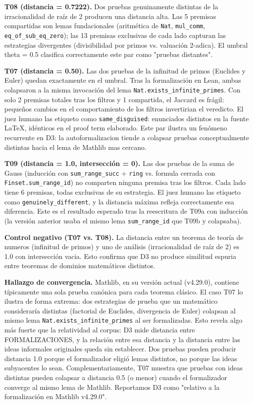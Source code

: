 \documentclass[12pt,a4paper]{article}
\theoremstyle{remark}
\begin{document}
\textbf{T08 (distancia = 0.7222).} Dos pruebas genuinamente distintas de la irracionalidad de raíz de 2 producen una distancia alta. Las 5 premisas compartidas son lemas fundacionales (aritmética de \texttt{Nat}, \texttt{mul\_comm}, \texttt{eq\_of\_sub\_eq\_zero}); las 13 premisas exclusivas de cada lado capturan las estrategias divergentes (divisibilidad por primos vs. valuación 2-adica). El umbral theta = 0.5 clasifica correctamente este par como "pruebas distantes".

\textbf{T07 (distancia = 0.50).} Las dos pruebas de la infinitud de primos (Euclides y Euler) quedan exactamente en el umbral. Tras la formalización en Lean, ambas colapsaron a la misma invocación del lema \texttt{Nat.exists\_infinite\_primes}. Con solo 2 premisas totales tras los filtros y 1 compartida, el Jaccard es frágil: pequeños cambios en el comportamiento de los filtros invertirian el veredicto. El juez humano las etiqueto como \texttt{same\_disguised}: enunciados distintos en la fuente LaTeX, idénticos en el proof term elaborado. Este par ilustra un fenómeno recurrente en D3: la autoformalizacion tiende a colapsar pruebas conceptualmente distintas hacia el lema de Mathlib mas cercano.


\textbf{T09 (distancia = 1.0, intersección = 0).} Las dos pruebas de la suma de Gauss (inducción con \texttt{sum\_range\_succ} + \texttt{ring} vs. formula cerrada con \texttt{Finset.sum\_range\_id}) no comparten ninguna premisa tras los filtros. Cada lado tiene 6 premisas, todas exclusivas de su estrategia. El juez humano las etiqueto como \texttt{genuinely\_different}, y la distancia máxima refleja correctamente esa diferencia. Este es el resultado esperado tras la reescritura de T09a con inducción (la versión anterior usaba el mismo lema \texttt{sum\_range\_id} que T09b y colapsaba).


\textbf{Control negativo (T07 vs. T08).} La distancia entre un teorema de teoría de numeros (infinitud de primos) y uno de análisis (irracionalidad de raíz de 2) es 1.0 con intersección vacia. Esto confirma que D3 no produce similitud espuria entre teoremas de dominios matemáticos distintos.


\textbf{Hallazgo de convergencia.} Mathlib, en su versión actual (v4.29.0), contiene típicamente una sola prueba canónica para cada teorema clásico. El caso T07 lo ilustra de forma extrema: dos estrategias de prueba que un matemático consideraría distintas (factorial de Euclides, divergencia de Euler) colapsan al mismo lema \texttt{Nat.exists\_infinite\_primes} al ser formalizadas. Esto revela algo más fuerte que la relatividad al corpus: D3 mide distancia entre FORMALIZACIONES, y la relación entre esa distancia y la distancia entre las ideas informales originales queda sin establecer. Dos pruebas pueden producir distancia 1.0 porque el formalizador eligió lemas distintos, no porque las ideas subyacentes lo sean. Complementariamente, T07 muestra que pruebas con ideas distintas pueden colapsar a distancia 0.5 (o menor) cuando el formalizador converge al mismo lema de Mathlib. Reportamos D3 como "relativo a la formalización en Mathlib v4.29.0".
\end{document}

